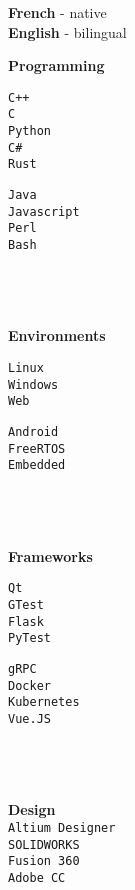 \documentclass[9pt]{developercv} %
\begin{document}
\begin{minipage}[t]{0.02\textwidth}
	\hfill
\end{minipage}
\begin{minipage}[t]{0.18\textwidth}
		\textbf{French} - native\\
		\textbf{English} - bilingual

		\textbf{Programming}\\
		\begin{minipage}[t]{0.5\textwidth}
			\texttt{C++}\\
			\texttt{C}\\
			\texttt{Python}\\
			\texttt{C\#}\\
			\texttt{Rust}
		\end{minipage}
		\begin{minipage}[t]{0.48\textwidth}
			\texttt{Java}\\
			\texttt{Javascript}\\
			\texttt{Perl}\\
			\texttt{Bash}
		\end{minipage}
		\\\\\\
		\textbf{Environments}\\
		\begin{minipage}[t]{0.5\textwidth}
			\texttt{Linux}\\
			\texttt{Windows}\\
			\texttt{Web}
		\end{minipage}
		\begin{minipage}[t]{0.48\textwidth}
			\texttt{Android}\\
			\texttt{FreeRTOS}\\
			\texttt{Embedded}
		\end{minipage}
		\\\\\\
		\textbf{Frameworks}\\
		\begin{minipage}[t]{0.5\textwidth}
			\texttt{Qt}\\
			\texttt{GTest}\\
			\texttt{Flask}\\
			\texttt{PyTest}
		\end{minipage}
		\begin{minipage}[t]{0.48\textwidth}
			\texttt{gRPC}\\
			\texttt{Docker}\\
			\texttt{Kubernetes}\\
			\texttt{Vue.JS}
		\end{minipage}
		\\\\\\
		\textbf{Design}\\
		\texttt{Altium Designer}\\
		\texttt{SOLIDWORKS}\\
		\texttt{Fusion 360}\\
		\texttt{Adobe CC}


\end{minipage}
\end{document}
